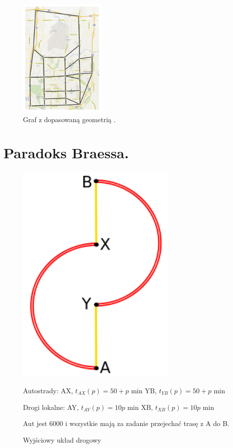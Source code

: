 \documentclass[twoside,12pt]{report}
\begin{document}
\begin{figure}[ht]
\includegraphics[width=0.38\textwidth]{img/dopasowanie}
\caption{Graf z dopasowaną geometrią \cite{siux}.}
\end{figure}

\section{Paradoks Braessa.}


\begin{figure}[ht]
\centering
\begin{minipage}{.48\textwidth}
\centering

\includegraphics[width=0.7\textwidth]{img/braess1}
\caption{Wyjściowy układ drogowy}

\end{minipage}\hfill
\begin{minipage}{.48\textwidth}
Autostrady:
AX, $t_{AX}(p) =  50 + p$ min
YB, $t_{YB}(p) =  50 + p$ min

Drogi lokalne:
AY, $t_{AY}(p) =  10p$ min
XB, $t_{XB}(p) =  10p$ min

Aut jest 6000 i wszystkie mają za zadanie przejechać trasę z A do B.
\end{minipage}\hfill
\end{figure}
\end{document}

